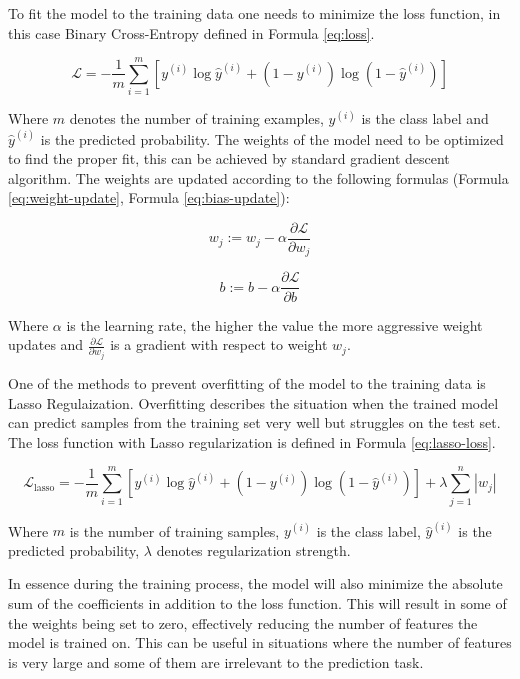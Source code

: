 \documentclass[12pt]{article}
\begin{document}
To fit the model to the training data one needs to minimize the loss function, in this case Binary Cross-Entropy defined in Formula \ref{eq:loss}.

\begin{equation}\label{eq:loss}
    \mathcal{L} = -\frac{1}{m} \sum_{i=1}^{m} \left[ y^{(i)} \log \hat{y}^{(i)} + \left(1 - y^{(i)}\right) \log \left(1 - \hat{y}^{(i)}\right) \right]
\end{equation}


Where $m$ denotes the number of training examples, $y^{(i)}$ is the class label and $\hat{y}^{(i)}$ is the predicted probability. The weights of the model need to be optimized to find the proper fit, this can be achieved by standard gradient descent algorithm. The weights are updated according to the following formulas (Formula \ref{eq:weight-update}, Formula \ref{eq:bias-update}):


\begin{equation}\label{eq:weight-update}
    w_j := w_j - \alpha \frac{\partial \mathcal{L}}{\partial w_j}
\end{equation}

\begin{equation}\label{eq:bias-update}
    b := b - \alpha \frac{\partial \mathcal{L}}{\partial b}
\end{equation}

Where $\alpha$ is the learning rate, the higher the value the more aggressive weight updates and $\frac{\partial \mathcal{L}}{\partial w_j}$ is a gradient with respect to weight $w_j$.


One of the methods to prevent overfitting of the model to the training data is Lasso Regulaization. Overfitting describes the situation when the trained model can predict samples from the training set very well but struggles on the test set. The loss function with Lasso regularization is defined in Formula \ref{eq:lasso-loss}.

\begin{equation}\label{eq:lasso-loss}
\mathcal{L}_{\text{lasso}} = -\frac{1}{m} \sum_{i=1}^{m} \left[ y^{(i)} \log \hat{y}^{(i)} + \left(1 - y^{(i)}\right) \log \left(1 - \hat{y}^{(i)}\right) \right] + \lambda \sum_{j=1}^{n} |w_j|
\end{equation}

Where $m$ is the number of training samples, $y^{(i)}$ is the class label, $\hat{y}^{(i)}$ is the predicted probability, $\lambda$ denotes regularization strength.

In essence during the training process, the model will also minimize the absolute sum of the coefficients in addition to the loss function. This will result in some of the weights being set to zero, effectively reducing the number of features the model is trained on. This can be useful in situations where the number of features is very large and some of them are irrelevant to the prediction task.
\end{document}
